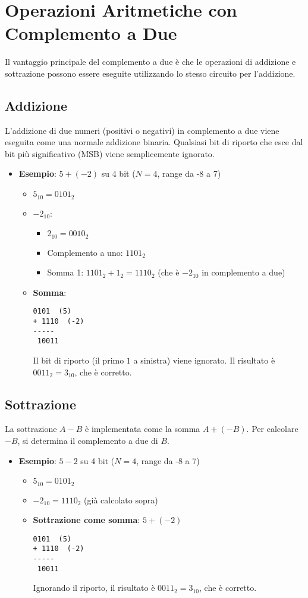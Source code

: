 \section{Operazioni Aritmetiche con Complemento a Due}
Il vantaggio principale del complemento a due è che le operazioni di addizione e sottrazione possono essere eseguite utilizzando lo stesso circuito per l'addizione.

\subsection{Addizione}
L'addizione di due numeri (positivi o negativi) in complemento a due viene eseguita come una normale addizione binaria. Qualsiasi bit di riporto che esce dal bit più significativo (MSB) viene semplicemente ignorato.
\begin{itemize}
    \item \textbf{Esempio}: $5 + (-2)$ su 4 bit ($N=4$, range da -8 a 7)
    \begin{itemize}
        \item $5_{10} = 0101_2$
        \item $-2_{10}$:
        \begin{itemize}
            \item $2_{10} = 0010_2$
            \item Complemento a uno: $1101_2$
            \item Somma 1: $1101_2 + 1_2 = 1110_2$ (che è $-2_{10}$ in complemento a due)
        \end{itemize}
        \item \textbf{Somma}:
        \begin{lstlisting}[language=Pseudocode, numbers=none]
  0101  (5)
+ 1110  (-2)
-----
 10011
        \end{lstlisting}
        Il bit di riporto (il primo $1$ a sinistra) viene ignorato. Il risultato è $0011_2 = 3_{10}$, che è corretto.
    \end{itemize}
\end{itemize}

\subsection{Sottrazione}
La sottrazione $A - B$ è implementata come la somma $A + (-B)$. Per calcolare $-B$, si determina il complemento a due di $B$.
\begin{itemize}
    \item \textbf{Esempio}: $5 - 2$ su 4 bit ($N=4$, range da -8 a 7)
    \begin{itemize}
        \item $5_{10} = 0101_2$
        \item $-2_{10} = 1110_2$ (già calcolato sopra)
        \item \textbf{Sottrazione come somma}: $5 + (-2)$
        \begin{lstlisting}[language=Pseudocode, numbers=none]
  0101  (5)
+ 1110  (-2)
-----
 10011
        \end{lstlisting}
        Ignorando il riporto, il risultato è $0011_2 = 3_{10}$, che è corretto.
    \end{itemize}
\end{itemize}


